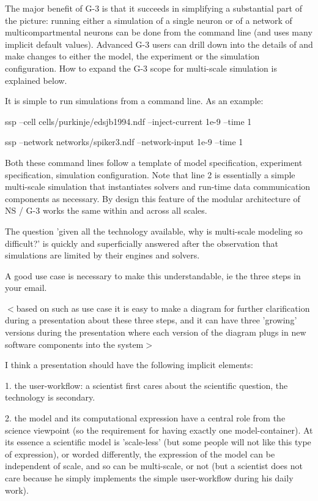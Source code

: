 \documentclass[12pt]{article}
\begin{document}
The major benefit of G-3 is that it succeeds in simplifying a
substantial part of the picture: running either a simulation of a
single neuron or of a network of multicompartmental neurons can be
done from the command line (and uses many implicit default values).
Advanced G-3 users can drill down into the details of and make changes
to either the model, the experiment or the simulation configuration.
How to expand the G-3 scope for multi-scale simulation is explained
below.

It is simple to run simulations from a command line.  As an example:

ssp --cell cells/purkinje/edsjb1994.ndf --inject-current 1e-9 --time 1

ssp --network networks/spiker3.ndf --network-input 1e-9 --time 1

Both these command lines follow a template of model specification,
experiment specification, simulation configuration.  Note that line 2
is essentially a simple multi-scale simulation that instantiates
solvers and run-time data communication components as necessary.  By
design this feature of the modular architecture of NS / G-3 works the
same within and across all scales.

The question 'given all the technology available, why is multi-scale
modeling so difficult?' is quickly and superficially answered after
the observation that simulations are limited by their engines and
solvers.

A good use case is necessary to make this understandable, ie the three
steps in your email.

$<$based on such as use case it is easy to make a diagram for further
clarification during a presentation about these three steps, and it
can have three 'growing' versions during the presentation where each
version of the diagram plugs in new software components into the
system$>$

I think a presentation should have the following implicit elements:

1. the user-workflow: a scientist first cares about the scientific
question, the technology is secondary.

2. the model and its computational expression have a central role from
the science viewpoint (so the requirement for having exactly one
model-container).  At its essence a scientific model is 'scale-less'
(but some people will not like this type of expression), or worded
differently, the expression of the model can be independent of scale,
and so can be multi-scale, or not (but a scientist does not care
because he simply implements the simple user-workflow during his daily
work).
\end{document}
